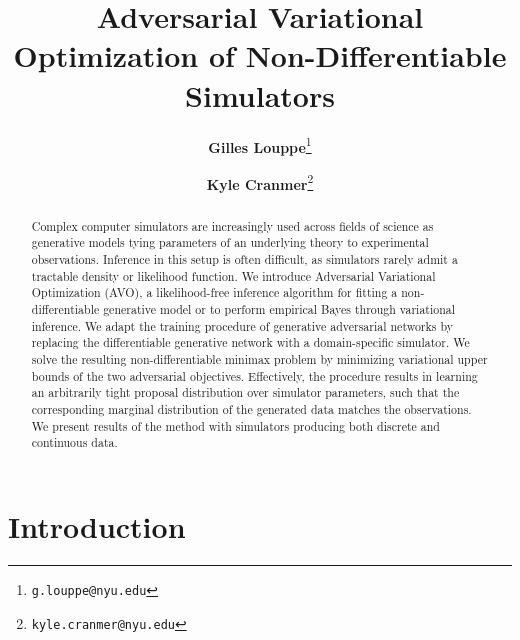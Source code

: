 \documentclass[twocolumn,superscriptaddress,aps]{revtex4-1}
\theoremstyle{plain}
\begin{document}

\title{\Large{Adversarial Variational Optimization of Non-Differentiable Simulators}}
\vspace{1cm}
\author{\small{\bf Gilles Louppe}\thanks{\texttt{g.louppe@nyu.edu}}}
\author{\small{\bf Kyle Cranmer}\thanks{\texttt{kyle.cranmer@nyu.edu}}}

\begin{abstract}
Complex computer simulators are increasingly used across fields of science as
generative models tying parameters of an underlying theory to
experimental observations. Inference in this setup is often
difficult, as simulators rarely admit a tractable density or likelihood
function. We introduce Adversarial Variational Optimization (AVO), a likelihood-free
inference algorithm for fitting a non-differentiable generative model or to perform empirical Bayes through variational inference.
We adapt the training procedure of generative
adversarial networks by replacing the differentiable generative network with a
domain-specific simulator. We solve the resulting non-differentiable
minimax problem by minimizing variational upper bounds of the two adversarial objectives.
Effectively, the procedure results in learning an arbitrarily tight
proposal distribution over simulator parameters, such that the corresponding
marginal distribution of the generated data matches the observations.
We present results of the method with simulators producing both discrete and continuous data.

\end{abstract}

\maketitle


\section{Introduction}

\end{document}
